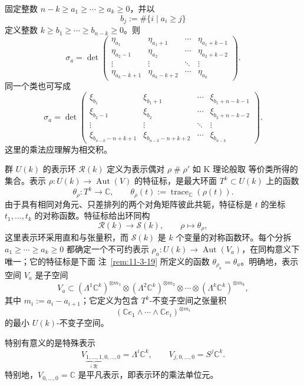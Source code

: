 \begin{remark}[Giambelli 公式]\label{rem:11-3-17}
固定整数 $n-k\geq a_1\geq\cdots\geq a_k\geq0$，并以
\[
  b_j:=\#\{i\mid a_i\geq j\}
\]
定义整数 $k\geq b_1\geq\cdots\geq b_{n-k}\geq0$。则
\[
  \sigma_a=
  \det\begin{pmatrix}
    \eta_{a_1}&\eta_{a_1+1}&\cdots&\eta_{a_1+k-1}\\
    \eta_{a_2-1}&\eta_{a_2}&\cdots&\eta_{a_2+k-2}\\
    \vdots&\vdots&\ddots&\vdots\\
    \eta_{a_k-k+1}&\eta_{a_k-k+2}&\cdots&\eta_{a_k}
  \end{pmatrix}.
\]
同一个类也可写成
\[
  \sigma_a=
  \det\begin{pmatrix}
    \xi_{b_1}&\xi_{b_1+1}&\cdots&\xi_{b_1+n-k-1}\\
    \xi_{b_2-1}&\xi_{b_2}&\cdots&\xi_{b_2+n-k-2}\\
    \vdots&\vdots&\ddots&\vdots\\
    \xi_{b_{n-k}-n+k+1}&\xi_{b_{n-k}-n+k+2}&\cdots&\xi_{b_{n-k}}
  \end{pmatrix}.
\]
这里的乘法应理解为相交积。
\end{remark}

群 $U(k)$ 的表示环 $\mathcal R(k)$ 定义为表示偶对 $\rho\mathbin\#\rho'$ 如 K 理论般取
等价类所得的集合。表示 $\rho:U(k)\to\operatorname{Aut}(V)$ 的特征标，是最大环面
$T^k\subset U(k)$ 上的函数
\[
  \theta_\rho:T^k\longrightarrow\mathbb C,
  \qquad \theta_\rho(t):=\operatorname{trace}_{\mathbb C}(\rho(t)).
\]
由于具有相同对角元、只差排列的两个对角矩阵彼此共轭，特征标是 $t$ 的坐标
$t_1,\ldots,t_k$ 的对称函数。特征标给出环同构
\[
  \mathcal R(k)\longrightarrow\mathcal S(k),
  \qquad \rho\longmapsto\theta_\rho,
\]
这里表示环采用直和与张量积，而 $\mathcal S(k)$ 是 $k$ 个变量的对称函数环。每个分拆
$a_1\geq\cdots\geq a_k\geq0$ 都确定一个不可约表示
$\rho_a:U(k)\to\operatorname{Aut}(V_a)$，在同构意义下唯一；它的特征标是下面
注~\ref{rem:11-3-19} 所定义的函数 $\theta_{\rho_a}=\theta_a$。明确地，表示空间 $V_a$
是子空间
\[
  V_a\subset
  (\Lambda^1\mathbb C^k)^{\otimes m_1}\otimes
  (\Lambda^2\mathbb C^k)^{\otimes m_2}\otimes\cdots\otimes
  (\Lambda^k\mathbb C^k)^{\otimes m_k},
\]
其中 $m_i:=a_i-a_{i+1}$；它定义为包含 $T^k$-不变子空间之张量积
\[
  (\mathbb Ce_1\wedge\cdots\wedge\mathbb Ce_i)^{\otimes m_i}
\]
的最小 $U(k)$-不变子空间。

\begin{remark}\label{rem:11-3-18}
特别有意义的是特殊表示
\[
  V_{\underbrace{1,\ldots,1}_{i\text{ 次}},0,\ldots,0}
  =\Lambda^i\mathbb C^k,
  \qquad
  V_{j,0,\ldots,0}=S^j\mathbb C^k.
\]
特别地，$V_{0,\ldots,0}=\mathbb C$ 是平凡表示，即表示环的乘法单位元。
\end{remark}

